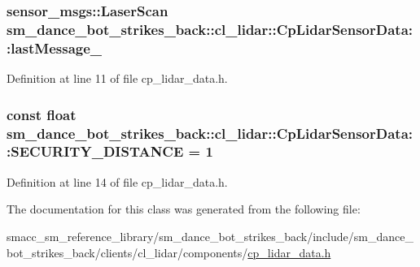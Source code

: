 \subsubsection[{\texorpdfstring{last\+Message\+\_\+}{lastMessage_}}]{\setlength{\rightskip}{0pt plus 5cm}sensor\+\_\+msgs\+::\+Laser\+Scan sm\+\_\+dance\+\_\+bot\+\_\+strikes\+\_\+back\+::cl\+\_\+lidar\+::\+Cp\+Lidar\+Sensor\+Data\+::last\+Message\+\_\+}\hypertarget{classsm__dance__bot__strikes__back_1_1cl__lidar_1_1CpLidarSensorData_a8a84fbb0a3f35a7fc040b266d33075ec}{}\label{classsm__dance__bot__strikes__back_1_1cl__lidar_1_1CpLidarSensorData_a8a84fbb0a3f35a7fc040b266d33075ec}


Definition at line 11 of file cp\+\_\+lidar\+\_\+data.\+h.

\subsubsection[{\texorpdfstring{S\+E\+C\+U\+R\+I\+T\+Y\+\_\+\+D\+I\+S\+T\+A\+N\+CE}{SECURITY_DISTANCE}}]{\setlength{\rightskip}{0pt plus 5cm}const float sm\+\_\+dance\+\_\+bot\+\_\+strikes\+\_\+back\+::cl\+\_\+lidar\+::\+Cp\+Lidar\+Sensor\+Data\+::\+S\+E\+C\+U\+R\+I\+T\+Y\+\_\+\+D\+I\+S\+T\+A\+N\+CE = 1}\hypertarget{classsm__dance__bot__strikes__back_1_1cl__lidar_1_1CpLidarSensorData_aa83f62091b2455323340a87e8636df60}{}\label{classsm__dance__bot__strikes__back_1_1cl__lidar_1_1CpLidarSensorData_aa83f62091b2455323340a87e8636df60}


Definition at line 14 of file cp\+\_\+lidar\+\_\+data.\+h.



The documentation for this class was generated from the following file\+:\begin{DoxyCompactItemize}
\item 
smacc\+\_\+sm\+\_\+reference\+\_\+library/sm\+\_\+dance\+\_\+bot\+\_\+strikes\+\_\+back/include/sm\+\_\+dance\+\_\+bot\+\_\+strikes\+\_\+back/clients/cl\+\_\+lidar/components/\hyperlink{sm__dance__bot__strikes__back_2include_2sm__dance__bot__strikes__back_2clients_2cl__lidar_2components_2cp__lidar__data_8h}{cp\+\_\+lidar\+\_\+data.\+h}\end{DoxyCompactItemize}
